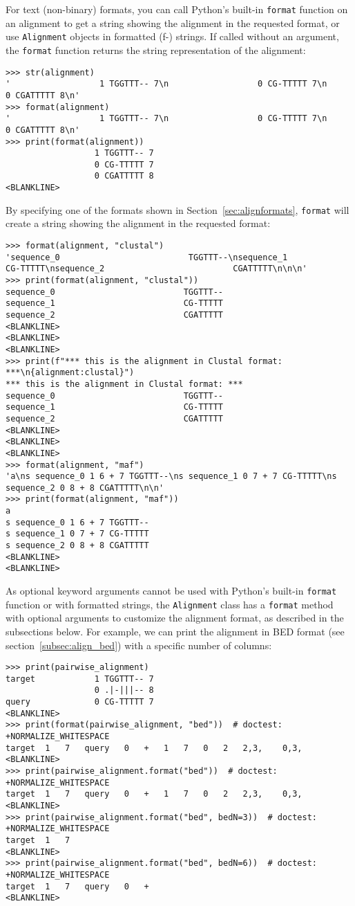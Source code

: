 For text (non-binary) formats, you can call Python's built-in \verb|format| function on an alignment to get a string showing the alignment in the requested format, or use \verb|Alignment| objects in formatted (f-) strings. If called without an argument, the \verb|format| function returns the string representation of the alignment:
\begin{verbatim}
>>> str(alignment)
'                  1 TGGTTT-- 7\n                  0 CG-TTTTT 7\n                  0 CGATTTTT 8\n'
>>> format(alignment)
'                  1 TGGTTT-- 7\n                  0 CG-TTTTT 7\n                  0 CGATTTTT 8\n'
>>> print(format(alignment))
                  1 TGGTTT-- 7
                  0 CG-TTTTT 7
                  0 CGATTTTT 8
<BLANKLINE>
\end{verbatim}
By specifying one of the formats shown in Section~\ref{sec:alignformats}, \verb+format+ will create a string showing the alignment in the requested format:
\begin{verbatim}
>>> format(alignment, "clustal")
'sequence_0                          TGGTTT--\nsequence_1                          CG-TTTTT\nsequence_2                          CGATTTTT\n\n\n'
>>> print(format(alignment, "clustal"))
sequence_0                          TGGTTT--
sequence_1                          CG-TTTTT
sequence_2                          CGATTTTT
<BLANKLINE>
<BLANKLINE>
<BLANKLINE>
>>> print(f"*** this is the alignment in Clustal format: ***\n{alignment:clustal}")
*** this is the alignment in Clustal format: ***
sequence_0                          TGGTTT--
sequence_1                          CG-TTTTT
sequence_2                          CGATTTTT
<BLANKLINE>
<BLANKLINE>
<BLANKLINE>
>>> format(alignment, "maf")
'a\ns sequence_0 1 6 + 7 TGGTTT--\ns sequence_1 0 7 + 7 CG-TTTTT\ns sequence_2 0 8 + 8 CGATTTTT\n\n'
>>> print(format(alignment, "maf"))
a
s sequence_0 1 6 + 7 TGGTTT--
s sequence_1 0 7 + 7 CG-TTTTT
s sequence_2 0 8 + 8 CGATTTTT
<BLANKLINE>
<BLANKLINE>
\end{verbatim}

As optional keyword arguments cannot be used with Python's built-in \verb|format| function or with formatted strings, the \verb|Alignment| class has a \verb|format| method with optional arguments to customize the alignment format, as described in the subsections below. For example, we can print the alignment in BED format (see section~\ref{subsec:align_bed}) with a specific number of columns:
\begin{verbatim}
>>> print(pairwise_alignment)
target            1 TGGTTT-- 7
                  0 .|-|||-- 8
query             0 CG-TTTTT 7
<BLANKLINE>
>>> print(format(pairwise_alignment, "bed"))  # doctest: +NORMALIZE_WHITESPACE
target	1	7	query	0	+	1	7	0	2	2,3,	0,3,
<BLANKLINE>
>>> print(pairwise_alignment.format("bed"))  # doctest: +NORMALIZE_WHITESPACE
target	1	7	query	0	+	1	7	0	2	2,3,	0,3,
<BLANKLINE>
>>> print(pairwise_alignment.format("bed", bedN=3))  # doctest: +NORMALIZE_WHITESPACE
target	1	7
<BLANKLINE>
>>> print(pairwise_alignment.format("bed", bedN=6))  # doctest: +NORMALIZE_WHITESPACE
target	1	7	query	0	+
<BLANKLINE>
\end{verbatim}


